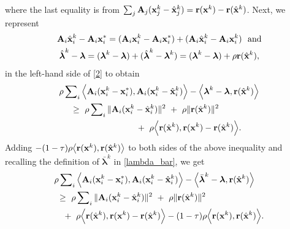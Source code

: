 \documentclass[doublecolumn]{IEEEtran}
\begin{document}
where the last equality is from $\sum_j{ {\bf A} }_j({ {\bf x} }_j^k-\hat{ {\bf x} }_j^k) = { {\bf r} }({ {\bf x} }^k)-{ {\bf r} }(\hat{ {\bf x} }^k)$.
Next, we represent
\begin{gather*}
{ {\bf A} }_i\hat{ {\bf x} }_i^k-{ {\bf A} }_i{ {\bf x} }_i^* = ({ {\bf A} }_i { {\bf x} }_i^k-{ {\bf A} }_i { {\bf x} }_i^*)+({ {\bf A} }_i\hat{ {\bf x} }_i^k-{ {\bf A} }_i{ {\bf x} }_i^k) ~~\text{and}\\
{\hat{\boldsymbol{\lambda}}^k-{\boldsymbol{\lambda}} = ({\boldsymbol{\lambda}}^k-{\boldsymbol{\lambda}})+(\hat{\boldsymbol{\lambda}}^k-{\boldsymbol{\lambda}}^k)} = ({\boldsymbol{\lambda}}^k-{\boldsymbol{\lambda}}) + \rho { {\bf r} }({\hat{\mathbf x}}^k),
\end{gather*}
in the left-hand side of \eqref{2} to obtain
\begin{align*}
& {\rho}\sum\nolimits_i\Big\langle { {\bf A} }_i( { {\bf x} }_i^k -{ {\bf x} }_i^*) , { {\bf A} }_i({ {\bf x} }_i^k-{\hat{\mathbf x}}_i^k) \Big\rangle - \Big\langle {\boldsymbol{\lambda}}^k-{\boldsymbol{\lambda}} ,  { {\bf r} }({\hat{\mathbf x}}^k) \Big\rangle  \notag\\
& ~~~~\geq~  {\rho} \sum\nolimits_i \|{ {\bf A} }_i({ {\bf x} }_i^{k}-\hat{ {\bf x} }_i^k)\|^2 ~+~ {\rho}\| { {\bf r} }({\hat{\mathbf x}}^k) \|   ^2 \\
& \qquad\qquad\qquad\qquad~~~+~ {\rho}\Big\langle { {\bf r} }({\hat{\mathbf x}}^k)  , { {\bf r} }({ {\bf x} }^k) - { {\bf r} }({\hat{\mathbf x}}^k) \Big\rangle.  \nonumber
\end{align*}
Adding $ -(1-\tau)\rho\big\langle { {\bf r} }({ {\bf x} }^k),{ {\bf r} }(\hat{ {\bf x} }^k)\big\rangle$ to both sides of the above inequality and recalling the definition of $\bar{\boldsymbol{\lambda}}^k$ in \eqref{lambda_bar}, we get
\begin{align}\label{4}
& {\rho}\sum\nolimits_i\Big\langle { {\bf A} }_i( { {\bf x} }_i^k -{ {\bf x} }_i^*) , { {\bf A} }_i({ {\bf x} }_i^k-{\hat{\mathbf x}}_i^k) \Big\rangle - \Big\langle \bar{\boldsymbol{\lambda}}^k-{\boldsymbol{\lambda}} ,  { {\bf r} }({\hat{\mathbf x}}^k) \Big\rangle  \notag\\
&~ \geq~  {\rho} \sum\nolimits_i \|{ {\bf A} }_i({ {\bf x} }_i^{k}-\hat{ {\bf x} }_i^k)\|^2 ~+~ {\rho}\| { {\bf r} }({\hat{\mathbf x}}^k) \|   ^2 \\
&  ~~~+~ {\rho}\Big\langle { {\bf r} }({\hat{\mathbf x}}^k)  , { {\bf r} }({ {\bf x} }^k) - { {\bf r} }({\hat{\mathbf x}}^k) \Big\rangle  -(1-\tau)\rho\Big\langle { {\bf r} }({ {\bf x} }^k),{ {\bf r} }(\hat{ {\bf x} }^k)\Big\rangle.  \nonumber
\end{align}
\end{document}
